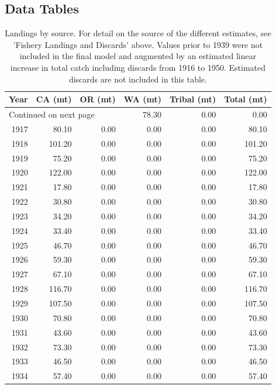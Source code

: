 \documentclass[12pt,]{article}
\begin{document}
\hypertarget{data-tables}{%
\subsection{Data Tables}\label{data-tables}}

\begin{longtable}{rrrrrr}
\caption{Landings by source.  For detail on the source of the different estimates, see 'Fishery Landings and Discards' above. Values prior to 1939 were not included in the final model and augmented by an estimated linear increase in total catch including discards from 1916 to 1950. Estimated discards are not included in this table.} \\ 
  \hline
Year & CA (mt) & OR (mt) & WA (mt) & Tribal (mt) & Total (mt) \\ 
  \hline 
\endhead 
\hline 
\multicolumn{3}{l}{\footnotesize Continued on next page} 
\endfoot 
\endlastfoot 
 \hline
1916 & 78.30 & 0.00 & 0.00 & 0.00 & 78.30 \\ 
  1917 & 80.10 & 0.00 & 0.00 & 0.00 & 80.10 \\ 
  1918 & 101.20 & 0.00 & 0.00 & 0.00 & 101.20 \\ 
  1919 & 75.20 & 0.00 & 0.00 & 0.00 & 75.20 \\ 
  1920 & 122.00 & 0.00 & 0.00 & 0.00 & 122.00 \\ 
  1921 & 17.80 & 0.00 & 0.00 & 0.00 & 17.80 \\ 
  1922 & 30.80 & 0.00 & 0.00 & 0.00 & 30.80 \\ 
  1923 & 34.20 & 0.00 & 0.00 & 0.00 & 34.20 \\ 
  1924 & 33.40 & 0.00 & 0.00 & 0.00 & 33.40 \\ 
  1925 & 46.70 & 0.00 & 0.00 & 0.00 & 46.70 \\ 
  1926 & 59.30 & 0.00 & 0.00 & 0.00 & 59.30 \\ 
  1927 & 67.10 & 0.00 & 0.00 & 0.00 & 67.10 \\ 
  1928 & 116.70 & 0.00 & 0.00 & 0.00 & 116.70 \\ 
  1929 & 107.50 & 0.00 & 0.00 & 0.00 & 107.50 \\ 
  1930 & 70.80 & 0.00 & 0.00 & 0.00 & 70.80 \\ 
  1931 & 43.60 & 0.00 & 0.00 & 0.00 & 43.60 \\ 
  1932 & 73.30 & 0.00 & 0.00 & 0.00 & 73.30 \\ 
  1933 & 46.50 & 0.00 & 0.00 & 0.00 & 46.50 \\ 
  1934 & 57.40 & 0.00 & 0.00 & 0.00 & 57.40 \\ 

\end{longtable}
\end{document}
